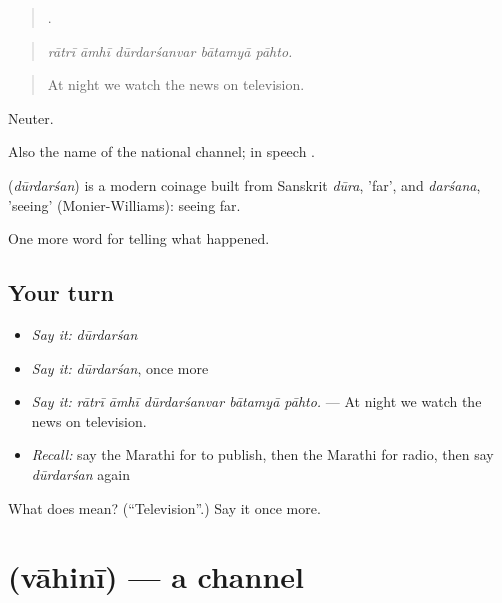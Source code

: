 \begin{quote}
    .
\end{quote}

\begin{quote}
\emph{rātrī āmhī dūrdarśanvar bātamyā pāhto.}
\end{quote}

\begin{quote}
At night we watch the news on television.
\end{quote}

Neuter.

Also the name of the national channel; in speech .

\begin{cousinweb}
\textbf{} (\emph{dūrdarśan}) is a modern coinage built from Sanskrit \emph{dūra}, 'far', and \emph{darśana}, 'seeing' (Monier-Williams): seeing far.
\end{cousinweb}

\begin{grammarlens}[title={What you've built}]
One more word for telling what happened.
\end{grammarlens}

\subsection*{Your turn}
\begin{itemize}
\raggedright
  \item \emph{Say it:} \emph{dūrdarśan}
  \item \emph{Say it:} \emph{dūrdarśan}, once more
  \item \emph{Say it:} \emph{rātrī āmhī dūrdarśanvar bātamyā pāhto.} — At night we watch the news on television.
  \item \emph{Recall:} say the Marathi for to publish, then the Marathi for radio, then say \emph{dūrdarśan} again
\end{itemize}

\begin{tcolorbox}[breakable,colback=teal!4,colframe=teal!35!black,title={Before you move on}]
What does  mean? (\textquotedblleft{}Television\textquotedblright{}.) Say it once more.
\end{tcolorbox}
\section[\texorpdfstring{\mr{वाहिनी} (vāhinī)}{वाहिनी (vāhinī)}]{ (vāhinī) — a channel}

